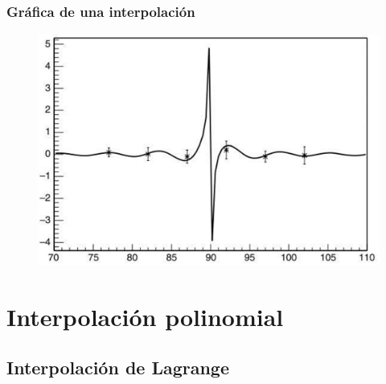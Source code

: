 \documentclass[12pt]{beamer}
\begin{document}
\begin{frame}
\frametitle{Gráfica de una interpolación}
\vspace*{-0.35cm}
\begin{figure}
	\centering
		\includegraphics[scale=0.6]{Imagenes/figura02.eps} 
\end{figure}
\end{frame}

\section{Interpolación polinomial}
\subsection{Interpolación de Lagrange}
\end{document}
